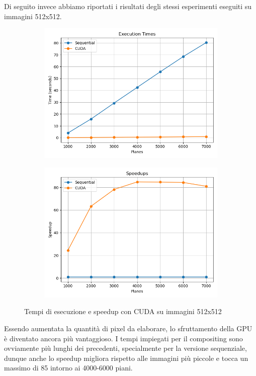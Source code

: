 Di seguito invece abbiamo riportati i risultati degli stessi esperimenti eseguiti su immagini 512x512.
\begin{figure}[H]
    \centering
    \begin{subfigure}{0.49\textwidth}
        \centering
        \includegraphics[width=\textwidth]{../results/plots/512/cuda_times}
    \end{subfigure}
    \begin{subfigure}{0.49\textwidth}
        \centering
        \includegraphics[width=\textwidth]{../results/plots/512/cuda_speedup}
    \end{subfigure}
    \caption{Tempi di esecuzione e speedup con CUDA su immagini 512x512}
    \label{fig:cuda_512}
\end{figure}
Essendo aumentata la quantità di pixel da elaborare, lo sfruttamento della GPU è diventato ancora più vantaggioso.
I tempi impiegati per il compositing sono ovviamente più lunghi dei precedenti, specialmente per la versione sequenziale,
dunque anche lo speedup migliora rispetto alle immagini più piccole e tocca un massimo di 85 intorno ai 4000-6000 piani.\\


